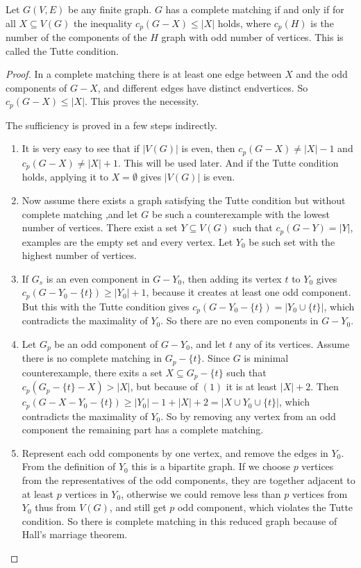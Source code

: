 \documentclass[12pt]{article}
\begin{document}
Let $G(V,E)$ be any finite graph. $G$ has a complete matching if and only if for all $X \subseteq V(G)$ the inequality $c_p(G-X) \leq |X|$ holds, where $c_p(H)$ is the number of the components of the $H$ graph with odd number of vertices. This is called the Tutte condition.

\begin{proof}
In a complete matching there is at least one edge between $X$ and the odd components of $G-X$, and different edges have distinct endvertices. So $c_p(G-X)\leq|X|$. This proves the necessity.

The sufficiency is proved in a few steps indirectly.
\begin{enumerate}
\item It is very easy to see that if $|V(G)|$ is even, then $c_p(G-X)\neq|X|-1$ and $c_p(G-X)\neq|X|+1$. This will be used later. And if the Tutte condition holds, applying it to $X=\emptyset$ gives $|V(G)|$ is even.

\item Now assume there exists a graph satisfying the Tutte condition but without complete matching ,and let $G$ be such a counterexample with the lowest number of vertices. There exist a set $Y\subseteq V(G)$ such that $c_p(G-Y)=|Y|$, examples are the empty set and  every vertex. Let $Y_0$ be such set with the highest number of vertices.

\item If $G_s$ is an even component in $G-Y_0$, then adding its vertex $t$ to $Y_0$ gives $c_p(G-Y_0-\{t\})\geq|Y_0|+1$, because it creates at least one odd component. But this with the Tutte condition gives $c_p(G-Y_0-\{t\})=|Y_0\cup\{t\}|$, which contradicts the maximality of $Y_0$. 
So there are no even components in $G-Y_0$.

\item Let $G_p$ be an odd component of $G-Y_0$, and let $t$ any of its vertices. Assume there is no complete matching in $G_p-\{t\}$. Since $G$ is minimal counterexample, there exits a set $X\subseteq G_p-\{t\}$ such that $c_p(G_p-\{t\}-X)>|X|$, but because of $(1)$ it is at least $|X|+2$. Then $c_p(G-X-Y_0-\{t\})\geq|Y_0|-1+|X|+2=|X\cup Y_0\cup\{t\}|$, which contradicts the maximality of $Y_0$. So by removing any vertex from an odd component the remaining part has a complete matching.

\item Represent each odd components by one vertex, and remove the edges in $Y_0$. From the definition of $Y_0$ this is a bipartite graph. If we choose $p$ vertices from the representatives of the odd components, they are together adjacent to at least $p$ vertices in $Y_0$, otherwise we could remove less than $p$ vertices from $Y_0$ thus from $V(G)$, and still get $p$ odd component, which violates the Tutte condition. So there is complete matching in this reduced graph because of Hall's marriage theorem.


\end{enumerate}
\end{proof}
\end{document}
